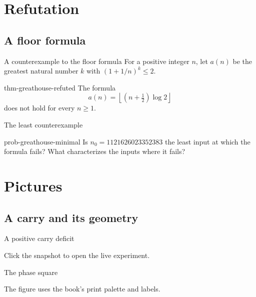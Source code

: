 \documentclass{beamer}
\begin{document}
\section{Refutation}
\subsection{A floor formula}
\begin{frame}{A counterexample to the floor formula}
  For a positive integer $n$, let $a(n)$ be the greatest natural number $k$ with $(1+1/n)^k\leq 2$.
  \begin{bookresult}{thm-greathouse-refuted}
    The formula
    \[
      a(n)=\left\lfloor\left(n+\tfrac12\right)\log 2\right\rfloor
    \]
    does not hold for every $n\geq1$.
  \end{bookresult}
\end{frame}
\begin{frame}{The least counterexample}
  \begin{bookresult}{prob-greathouse-minimal}
    Is $n_0=1121626023352383$ the least input at which the formula fails? What characterizes the inputs where it fails?
  \end{bookresult}
\end{frame}
\section{Pictures}
\subsection{A carry and its geometry}
\begin{frame}{A positive carry deficit}
  \centering
  \par\smallskip\small Click the snapshot to open the live experiment.
\end{frame}
\begin{frame}{The phase square}
  \centering
  \par\smallskip\small The figure uses the book's print palette and labels.
\end{frame}
\appendix
\end{document}

